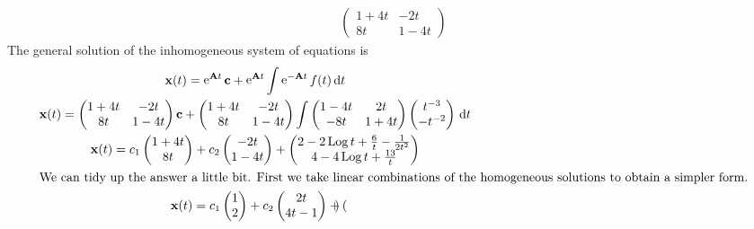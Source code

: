 \begin{Example}
\begin{gather*}
\begin{pmatrix}
      1 + 4 t & -2 t \\
      8 t & 1 - 4 t
    \end{pmatrix}
  \end{gather*}
  The general solution of the inhomogeneous system of equations is
  \begin{gather*}
    \mathbf{x}(t) = \mathop{\mathrm{e}}\nolimits^{\mathbf{A} t} \mathbf{c} + \mathop{\mathrm{e}}\nolimits^{\mathbf{A} t} \int \mathop{\mathrm{e}}\nolimits^{-\mathbf{A} t} f(t) \,\mathrm{d} t \\
    \mathbf{x}(t) = 
    \begin{pmatrix}
      1 + 4 t & -2 t \\
      8 t & 1 - 4 t
    \end{pmatrix} \mathbf{c} 
    + 
    \begin{pmatrix}
      1 + 4 t & -2 t \\
      8 t & 1 - 4 t
    \end{pmatrix}
    \int 
    \begin{pmatrix}
      1 - 4 t & 2 t \\
      - 8 t & 1 + 4 t
    \end{pmatrix}
    \begin{pmatrix}
      t^{-3} \\
      - t^{-2}
    \end{pmatrix}
    \,\mathrm{d} t \\
    \mathbf{x}(t) = 
    c_1 \begin{pmatrix} 1 + 4 t \\ 8 t \end{pmatrix}
    + c_2 \begin{pmatrix} - 2 t \\ 1 - 4 t \end{pmatrix}
    + 
    \begin{pmatrix}
      2 - 2 \mathop{\mathrm{Log}}\nolimits t + \frac{6}{t} - \frac{1}{2 t^2} \\
      4 - 4 \mathop{\mathrm{Log}}\nolimits t + \frac{13}{t}
    \end{pmatrix} \\
    \intertext{We can tidy up the answer a little bit.  
      First we take linear combinations of the homogeneous solutions to
      obtain a simpler form.}
    \mathbf{x}(t) = 
    c_1 \begin{pmatrix} 1 \\ 2 \end{pmatrix}
    + c_2 \begin{pmatrix} 2 t \\ 4 t - 1 \end{pmatrix}
    + 
    \begin{pmatrix}

\end{pmatrix}
\end{gather*}
\end{Example}
